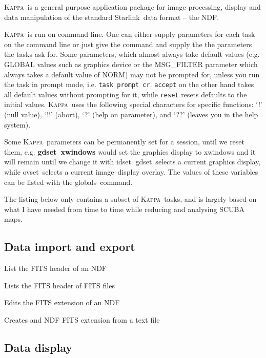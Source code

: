 \documentclass[twoside,11pt]{article}
\newcommand{\starlink}{\htmladdnormallink{Starlink}{http://star-www.rl.ac.uk/}}
\newcommand{\Kappa}{\xref{\textsc{Kappa}}{sun95}{}}
\newcommand{\ndf}{\xref{NDF}{sun33}{}}
\newcommand{\task}[1]{\textsf{#1}}
\newcommand{\param}[1]{\texttt{#1}}
\newcommand{\globals}{\xref{\task{globals}}{sun95}{GLOBALS}}
\newcommand{\fitslist}{\xref{\task{fitslist}}{sun95}{FITSLIST}}
\newcommand{\fitsedit}{\xref{\task{fitsedit}}{sun95}{FITSEDIT}}
\newcommand{\gdset}{\xref{\task{gdset}}{sun95}{GDSET}}
\newcommand{\idset}{\xref{\task{idset}}{sun95}{IDSET}}
\newcommand{\ovset}{\xref{\task{ovset}}{sun95}{OVSET}}
\newcommand{\fitstext}{\xref{\task{fitstext}}{sun95}{FITSTEXT}}
\newcommand{\fitshead}{\xref{\task{fitshead}}{sun95}{FITSHEAD}}
\newcommand{\htmladdnormallink}[2]{#1}
\newcommand{\xref}[3]{#1}
\newcommand{\xlabel}[1]{}
\begin{document}
{\Kappa\ is a general purpose application package for image processing,
display and data manipulation of the standard \starlink\ data format
-- the \ndf.

\Kappa\ is run on command line. One can either supply parameters for each
task on the command line or just give the command and supply the the
parameters the tasks ask for. Some parameters, which almost always take
default values (e.g. GLOBAL values such as graphics device or the MSG\_FILTER
parameter which always takes a default value of NORM) may not be prompted
for, unless you run the task in prompt mode, i.e. \texttt{task prompt
cr}. \param{accept} on the other hand takes all default values without
prompting for it, while \param{reset} resets defaults to the initial values.
\Kappa\ uses the following special characters for specific functions:
`!' (null value), `!!' (abort), `?' (help on parameter), and `??' (leaves you
in the help system).

Some \Kappa\ parameters can be permanently set for a session, until we reset
them, e.g. \textbf{\gdset\ xwindows} would set the graphics display to
xwindows and it will remain until we change it with \idset. \gdset\ selects a
current graphics display, while \ovset\ selects a current image--display
overlay. The values of these variables can be listed with the \globals\
command.

The listing below only contains a subset of \Kappa\ tasks, and is largely
based on what I have needed from time to time while reducing and analysing
SCUBA maps.

\subsection{\xlabel{data_import_and_export}Data import and export}

\begin{description}
\setlength{\itemsep}{-5pt}

\item[\fitslist] List the FITS header of an NDF
\item[\fitshead] Lists the FITS header of FITS files
\item[\fitsedit] Edits the FITS extension of an NDF
\item[\fitstext] Creates and NDF FITS extension from a text file

\end{description}

\subsection{\xlabel{data_display}Data display}

}
\end{document}
